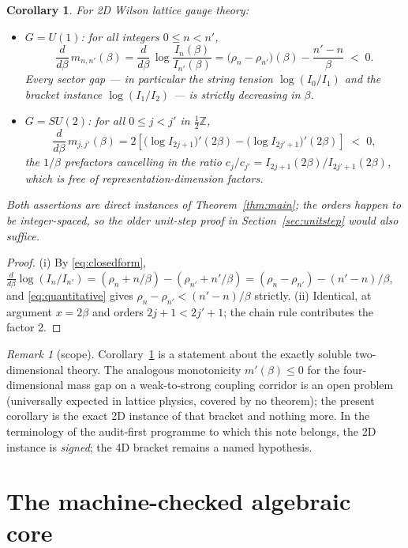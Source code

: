 \documentclass[11pt]{article}
\newtheorem{corollary}[theorem]{Corollary}
\theoremstyle{remark}
\newtheorem{remark}[theorem]{Remark}
\begin{document}
\begin{corollary}
\label{cor:ym}
For 2D Wilson lattice gauge theory:
\begin{itemize}
\item[(i)] $G = U(1)$: for all integers $0 \le n < n'$,
\[
\frac{d}{d\beta}\, m_{n,n'}(\beta)
= \frac{d}{d\beta}\, \log\frac{I_n(\beta)}{I_{n'}(\beta)}
= \bigl(\rho_n - \rho_{n'}\bigr)(\beta) - \frac{n'-n}{\beta}
\;<\; 0 .
\]
Every sector gap --- in particular the string tension $\log(I_0/I_1)$
and the bracket instance $\log(I_1/I_2)$ --- is strictly decreasing
in $\beta$.
\item[(ii)] $G = SU(2)$: for all $0 \le j < j'$ in
$\tfrac12\mathbb{Z}$,
\[
\frac{d}{d\beta}\, m_{j,j'}(\beta)
= 2\left[\bigl(\log I_{2j+1}\bigr)'(2\beta)
- \bigl(\log I_{2j'+1}\bigr)'(2\beta)\right] \;<\; 0 ,
\]
the $1/\beta$ prefactors cancelling in the ratio
$c_j/c_{j'} = I_{2j+1}(2\beta)/I_{2j'+1}(2\beta)$, which is free of
representation-dimension factors.
\end{itemize}
Both assertions are direct instances of Theorem~\ref{thm:main}; the
orders happen to be integer-spaced, so the older unit-step proof in
Section~\ref{sec:unitstep} would also suffice.
\end{corollary}

\begin{proof}
(i) By \eqref{eq:closedform},
$\frac{d}{d\beta}\log(I_n/I_{n'}) = (\rho_n + n/\beta) - (\rho_{n'} +
n'/\beta) = (\rho_n - \rho_{n'}) - (n'-n)/\beta$, and
\eqref{eq:quantitative} gives
$\rho_n - \rho_{n'} < (n'-n)/\beta$ strictly. (ii) Identical, at
argument $x = 2\beta$ and orders $2j+1 < 2j'+1$; the chain rule
contributes the factor $2$.
\end{proof}

\begin{remark}[scope]
Corollary~\ref{cor:ym} is a statement about the exactly soluble
two-dimensional theory. The analogous monotonicity $m'(\beta) \le 0$
for the four-dimensional mass gap on a weak-to-strong coupling corridor
is an open problem (universally expected in lattice physics, covered by
no theorem); the present corollary is the exact 2D instance of that
bracket and nothing more. In the terminology of the audit-first
programme to which this note belongs, the 2D instance is
\emph{signed}; the 4D bracket remains a named hypothesis.
\end{remark}

\section{The machine-checked algebraic core}
\label{sec:lean}
\end{document}

